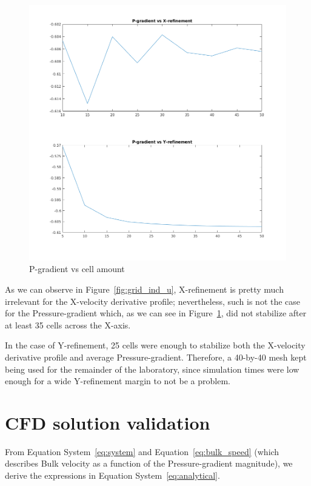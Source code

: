 \documentclass[12pt]{article}
\begin{document}
        \begin{figure}[!ht]
                \includegraphics[width=\textwidth]{Grid_Ind_P_Gradient.png}
                \centering
                \caption{P-gradient vs cell amount}
                \label{fig:grid_ind_p}
        \end{figure}

        As we can observe in Figure~\ref{fig:grid_ind_u}, X-refinement is pretty much irrelevant for the X-velocity derivative profile; nevertheless, such is not the case for the Pressure-gradient which, as we can see in Figure~\ref{fig:grid_ind_p}, did not stabilize after at least 35 cells across the X-axis.

        In the case of Y-refinement, 25 cells were enough to stabilize both the X-velocity derivative profile and average Pressure-gradient. Therefore, a 40-by-40 mesh kept being used for the remainder of the laboratory, since simulation times were low enough for a wide Y-refinement margin to not be a problem.

\section{CFD solution validation} \label{sec:CFD_validation}

        From Equation System~\ref{eq:system} and Equation~\ref{eq:bulk_speed} (which describes Bulk velocity as a function of the Pressure-gradient magnitude), we derive the expressions in Equation System~\ref{eq:analytical}.
\end{document}
